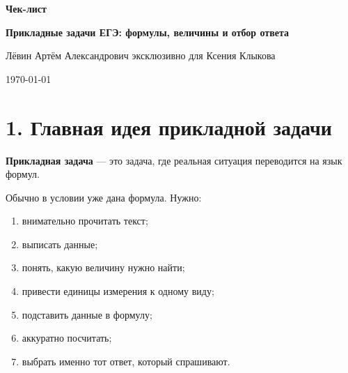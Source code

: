 \documentclass[a4paper,12pt]{article}
\newcommand{\topic}{Прикладные задачи ЕГЭ: формулы, величины и отбор ответа}
\newcommand{\student}{Ксения Клыкова}
\newcommand{\teacher}{Лёвин Артём Александрович}
\begin{document}
\begin{titlepage}
\thispagestyle{empty}
\centering

\vspace*{35mm}

{\Large\textcolor{accent}{\textbf{Чек-лист}}\par}

\vspace{8mm}

{\Huge\textbf{\topic}\par}

\vspace{12mm}

{\large \teacher{} эксклюзивно для \student\par}

\vspace{8mm}

{\large \today\par}

\vfill


\end{titlepage}

\section*{1. Главная идея прикладной задачи}

\textbf{Прикладная задача} — это задача, где реальная ситуация переводится на язык формул.

Обычно в условии уже дана формула. Нужно:

\begin{enumerate}
  \item внимательно прочитать текст;
  \item выписать данные;
  \item понять, какую величину нужно найти;
  \item привести единицы измерения к одному виду;
  \item подставить данные в формулу;
  \item аккуратно посчитать;
  \item выбрать именно тот ответ, который спрашивают.
\end{enumerate}
\end{document}
